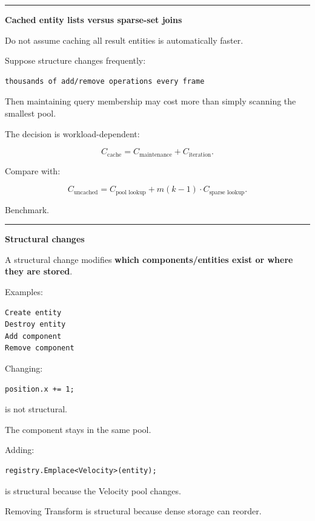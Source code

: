 \begin{center}\rule{0.5\linewidth}{0.5pt}\end{center}

\textbf{Cached entity lists versus sparse-set joins}

Do not assume caching all result entities is automatically faster.

Suppose structure changes frequently:

\begin{verbatim}
thousands of add/remove operations every frame
\end{verbatim}

Then maintaining query membership may cost more than simply scanning the smallest pool.

The decision is workload-dependent:

\[
C_{\text{cache}}
=
C_{\text{maintenance}}
+
C_{\text{iteration}}.
\]

Compare with:

\[
C_{\text{uncached}}
=
C_{\text{pool lookup}}
+
m(k-1)\cdot C_{\text{sparse lookup}}.
\]

Benchmark.

\begin{center}\rule{0.5\linewidth}{0.5pt}\end{center}

\textbf{Structural changes}

A structural change modifies \textbf{which components/entities exist or where they are stored}.

Examples:

\begin{verbatim}
Create entity
Destroy entity
Add component
Remove component
\end{verbatim}

Changing:

\begin{verbatim}
position.x += 1;
\end{verbatim}

is not structural.

The component stays in the same pool.

Adding:

\begin{verbatim}
registry.Emplace<Velocity>(entity);
\end{verbatim}

is structural because the Velocity pool changes.

Removing Transform is structural because dense storage can reorder.

